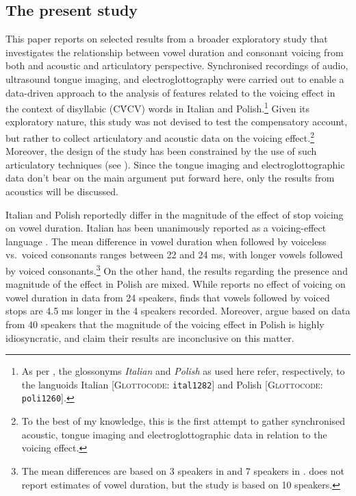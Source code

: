 \documentclass[preprint]{JASAnew}
\begin{document}
\hypertarget{the-present-study}{%
\subsection{The present study}\label{the-present-study}}

This paper reports on selected results from a broader exploratory study
that investigates the relationship between vowel duration and consonant
voicing from both and acoustic and articulatory perspective.
Synchronised recordings of audio, ultrasound tongue imaging, and
electroglottography were carried out to enable a data-driven approach to
the analysis of features related to the voicing effect in the context of
disyllabic (CV́CV) words in Italian and
Polish.\footnote{As per \citet{cysouw2013}, the glossonyms \textit{Italian} and \textit{Polish} as used here refer, respectively, to the languoids Italian [\textsc{Glottocode}: \texttt{ital1282}] and Polish [\textsc{Glottocode}: \texttt{poli1260}].}
Given its exploratory nature, this study was not devised to test the
compensatory account, but rather to collect articulatory and acoustic
data on the voicing
effect.\footnote{To the best of my knowledge, this is the first attempt to gather synchronised acoustic, tongue imaging and electroglottographic data in relation to the voicing effect.}
Moreover, the design of the study has been constrained by the use of
such articulatory techniques (see ). Since the tongue
imaging and electroglottographic data don't bear on the main argument
put forward here, only the results from acoustics will be discussed.

Italian and Polish reportedly differ in the magnitude of the effect of
stop voicing on vowel duration. Italian has been unanimously reported as
a voicing-effect language
\citep{caldognetto1979, farnetani1986, esposito2002}. The mean
difference in vowel duration when followed by voiceless vs.~voiced
consonants ranges between 22 and 24 ms, with longer vowels followed by
voiced
consonants.\footnote{The mean differences are based on 3 speakers in \citealt{farnetani1986} and 7 speakers in \citealt{esposito2002}. \citealt{caldognetto1979} does not report estimates of vowel duration, but the study is based on 10 speakers.}
On the other hand, the results regarding the presence and magnitude of
the effect in Polish are mixed. While \citet{keating1984} reports no
effect of voicing on vowel duration in data from 24 speakers,
\citet{nowak2006} finds that vowels followed by voiced stops are 4.5 ms
longer in the 4 speakers recorded. Moreover, \citet{malisz2008} argue
based on data from 40 speakers that the magnitude of the voicing effect
in Polish is highly idiosyncratic, and claim their results are
inconclusive on this matter.
\end{document}
